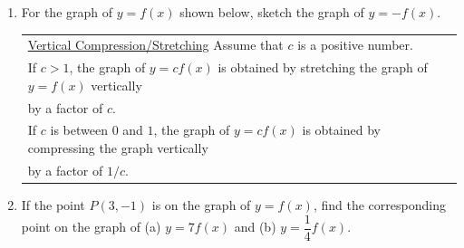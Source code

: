 \begin{enumerate}
\vspace{-.1in}
\item For the graph of $y=f(x)$ shown below, sketch the graph of $y=-f(x)$.\\




\hspace{-.3in} \begin{tabular}{| l |} \hline \underline{Vertical Compression/Stretching} Assume that $c$ is a positive number. \\
If $c>1$, the graph of $y=cf(x)$ is obtained by stretching the graph of $y=f(x)$ vertically \\ by a factor of $c$. \\
If $c$ is between $0$ and $1$, the graph of $y=cf(x)$ is obtained by compressing the graph vertically\\ by a factor of $1/c$.
 \\ \hline
\end{tabular} 


\vspace{-.1in}
\item If the point $P(3,-1)$ is on the graph of $y=f(x)$, find the corresponding point on the graph of (a) $y = 7f(x)$ and (b) $y = \dfrac{1}{4}f(x)$. \\[.4in]




\end{enumerate}
